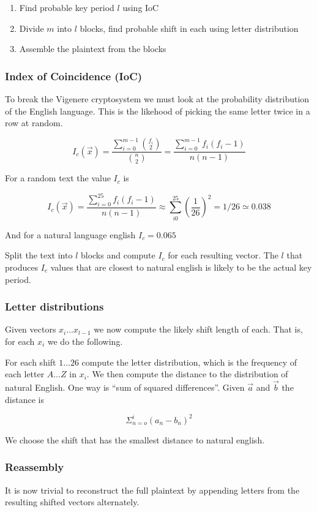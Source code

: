 \begin{enumerate}
\item Find probable key period $l$ using IoC
\item Divide $m$ into $l$ blocks, find probable shift in each using
  letter distribution
\item Assemble the plaintext from the blocks
\end{enumerate}

\subsubsection{Index of Coincidence (IoC)}
To break the Vigenere cryptosystem we must look at the probability
distribution of the English language. This is the likehood of picking
the same letter twice in a row at random.

\[ I_c(\vec{x}) =
\frac{\sum^{m-1}_{i=0}\binom{f_i}{2}}{\binom{n}{2}}=
\frac{\sum^{m-1}_{i=0}f_i(f_i - 1)}{n(n-1)}\]

For a random text the value $I_c$ is

\[ I_c(\vec{x}) =
\frac{\sum^{25}_{i=0}f_i(f_i - 1)}{n(n-1)} \approx
\sum^{25}_{i0}(\frac{1}{26})^2= 1/26 \simeq 0.038\]

And for a natural language english $I_c = 0.065$

Split the text into $l$ blocks and compute $I_c$ for each resulting
vector. The $l$ that produces $I_c$ values that are closest to natural
english is likely to be the actual key period.

\subsubsection{Letter distributions}

Given vectors $x_i \ldots x_{l-1}$ we now compute the likely shift
length of each. That is, for each $x_i$ we do the following.

For each shift $1 \ldots 26$ compute the letter distribution, which is
the frequency of each letter $A \ldots Z$ in $x_i$. We then compute
the distance to the distribution of natural English. One way is ``sum
of squared differences''. Given $\overrightarrow{a}$ and
$\overrightarrow{b}$ the distance is

\[\Sigma_{n=o}^i (a_n - b_n)^2 \]

We choose the shift that has the smallest distance to natural english.

\subsubsection{Reassembly}
It is now trivial to reconstruct the full plaintext by appending
letters from the resulting shifted vectors alternately.